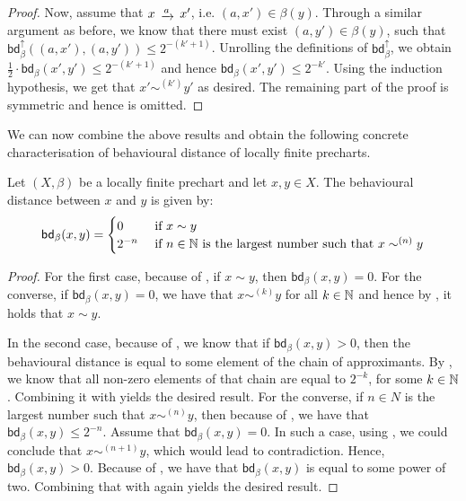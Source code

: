 \begin{proof}
		Now, assume that $x \tr{a} x'$, i.e. $(a,x') \in \beta(y)$. Through a similar argument as before, we know that there must exist $(a,y')\in \beta(y)$, such that $\mathsf{bd}_\beta^\uparrow((a,x'),(a,y')) \leq 2^{-(k'+1)}$. Unrolling the definitions of $\mathsf{bd}_\beta^\uparrow$, we obtain $\frac{1}{2} \cdot \mathsf{bd}_{\beta}(x',y') \leq 2^{-(k'+1)}$ and hence $\mathsf{bd}_{\beta}(x',y') \leq 2^{-k'}$. Using the induction hypothesis, we get that $x' \sim^{(k')} y'$ as desired. The remaining part of the proof is symmetric and hence is omitted.
\end{proof}
We can now combine the above results and obtain the following concrete characterisation of behavioural distance of locally finite precharts.
\begin{theorem}\label{thm:concrete_distance}
Let $(X,\beta)$ be a locally finite prechart and let $x,y \in X$. The behavioural distance between $x$ and $y$ is given by:
	$$\mathsf{bd}_\beta(x,y) = \begin{cases}
		0 & \text{ if } x \sim y\\
		2^{-n} & \text{ if } n \in \mathbb{N} \text{ is the largest number such that } x\sim^{(n)} y
	\end{cases}$$
\end{theorem}
\begin{proof}
	For the first case, because of , if $x \sim y$, then $\mathsf{bd}_{\beta}(x,y)=0$. For the converse, if $\mathsf{bd}_{\beta}(x,y)=0$, we have that $x \sim^{(k)} y$ for all $k \in \mathbb{N}$ and hence by , it holds that $x \sim y$.
	
	 In the second case, because of , we know that if $\mathsf{bd}_\beta(x,y) > 0$, then the behavioural distance is equal to some element of the chain of approximants. By , we know that all non-zero elements of that chain are equal to $2^{-k}$, for some $k \in \mathbb{N}$. Combining it with  yields the desired result. 
	 For the converse, if $n \in N$ is the largest number such that $x \sim^{(n)} y$, then because of , we have that $\mathsf{bd}_\beta(x,y)\leq 2^{-n}$. Assume that $\mathsf{bd}_\beta(x,y)=0$. In such a case, using , we could conclude that $x \sim^{(n+1)} y$, which would lead to contradiction. Hence, $\mathsf{bd}_\beta(x,y)>0$. Because of , we have that $\mathsf{bd}_\beta(x,y)$ is equal to some power of two. Combining that with  again yields the desired result.\qedhere
\end{proof}

